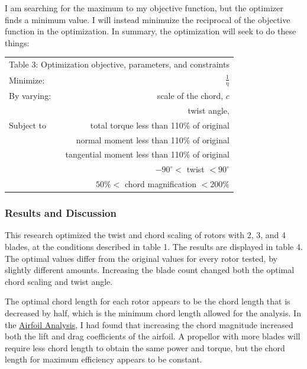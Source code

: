 \documentclass{article}
\begin{document}
\raggedright
I am searching for the maximum to my objective function, but the optimizer finds a minimum value. I will instead minimuize the reciprocal of the objective function in the optimization. In summary, the optimization will seek to do these things: \newline

\begin{tabular}{l  r}
	 \multicolumn{2}{c}{Table 3: Optimization objective, parameters, and constraints}  \\
  	Minimize: & $\frac{1}{\eta}$ \\ \hline
  	By varying: & scale of the chord, $c$ \\ 
  	 & twist angle, \\  \hline
  	Subject to & total torque less than 110\% of original \\ 
	 & normal moment less than 110\% of original \\ 
	 & tangential moment less than 110\% of original \\ 
	 & $-90^{\circ} <$ twist $< 90^{\circ}$ \\
	 & $50\% <$ chord magnification $< 200\% $
\end{tabular} \newline

\subsubsection*{Results and Discussion}

This research optimized the twist and chord scaling of rotors with 2, 3, and 4 blades, at the conditions described in table 1. The results are displayed in table 4. The optimal values differ from the original values for every rotor tested, by slightly different amounts. Increasing the blade count changed both the optimal chord scaling and twist angle. \newline

The optimal chord length for each rotor appears to be the chord length that is decreased by half, which is the minimum chord length allowed for the analysis. In the \href{https://github.com/JoeSpencer1/497R-Projects/blob/main/Airfoil Analysis/Airfoil_Analysis.pdf}{Airfoil Analysis}, I had found that increasing the chord magnitude increased both the lift and drag coefficients of the airfoil. A propellor with more blades will require less chord length to obtain the same power and torque, but the chord length for maximum efficiency appears to be constant. \newline
\end{document}
